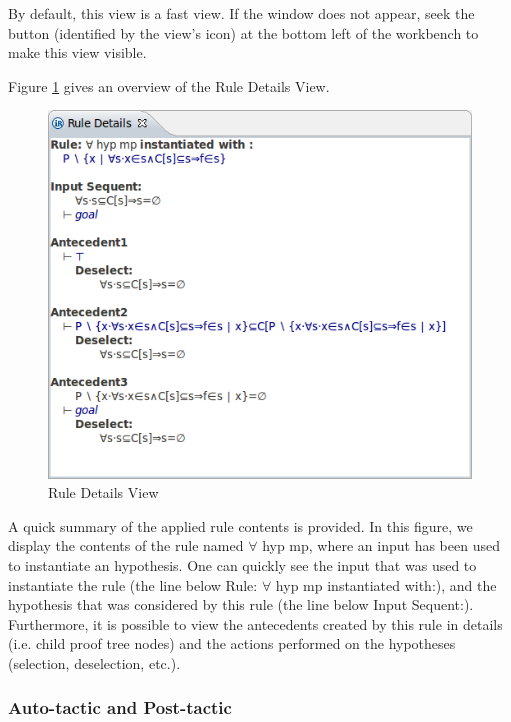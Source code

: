 By default, this view is a fast view. If the window does not appear, seek the button (identified by the view's icon) at the bottom left of the workbench to make this view visible.

Figure \ref{fig_ref_01_proving_perspective10} gives an overview of the \textsf{Rule Details View}.

\begin{figure}[!ht]
\begin{center}
	\includegraphics{img/reference/ref_01_proving_perspective10.png}
	\caption{Rule Details View}
	\label{fig_ref_01_proving_perspective10}
\end{center}
\end{figure}

A quick summary of the applied rule contents is provided. In this figure, we display the contents of the rule named \textsf{$\forall$ hyp mp}, where an input has been used to instantiate an hypothesis. One can quickly see the input that was used to instantiate the rule (the line below \textsf{Rule: $\forall$ hyp mp instantiated with:}), and the hypothesis that was considered by this rule (the line below \textsf{Input Sequent:}). Furthermore, it is possible to view the antecedents created by this rule in details (i.e. child proof tree nodes) and the actions performed on the hypotheses (selection, deselection, etc.). 

\subsubsection{Auto-tactic and Post-tactic}

